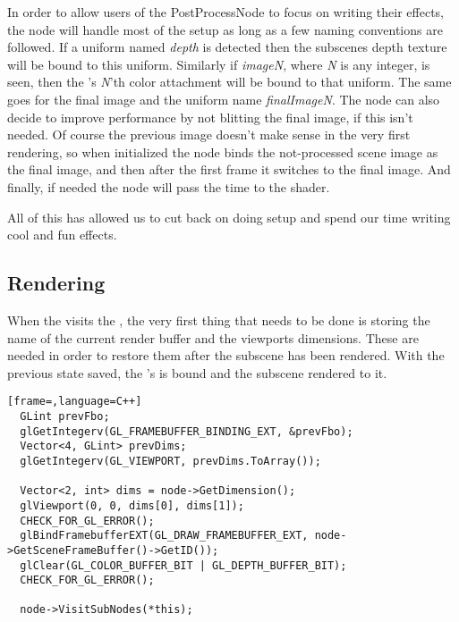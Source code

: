 In order to allow users of the PostProcessNode to focus on writing
their effects, the node will handle most of the setup as long as a few
naming conventions are followed. If a uniform named \textit{depth} is
detected then the subscenes depth texture will be bound to this
uniform. Similarly if \textit{imageN}, where \textit{N} is any
integer, is seen, then the 's \textit{N}'th color
attachment will be bound to that uniform. The same goes for the final
image and the uniform name \textit{finalImageN}. The node can also
decide to improve performance by not blitting the final image, if this
isn't needed. Of course the previous image doesn't make sense in the
very first rendering, so when initialized the node binds the
not-processed scene image as the final image, and then after the first
frame it switches to the final image. And finally, if needed the node
will pass the time to the shader.

All of this has allowed us to cut back on doing setup and spend our
time writing cool and fun effects.

\subsection*{Rendering}


When the  visits the , the
very first thing that needs to be done is storing the name of the
current render buffer and the viewports dimensions. These are needed
in order to restore them after the subscene has been rendered. With
the previous state saved, the 's
 is bound and the subscene rendered to it.

\begin{lstlisting}[frame=,language=C++]
  GLint prevFbo;
  glGetIntegerv(GL_FRAMEBUFFER_BINDING_EXT, &prevFbo);
  Vector<4, GLint> prevDims;
  glGetIntegerv(GL_VIEWPORT, prevDims.ToArray());
  
  Vector<2, int> dims = node->GetDimension();
  glViewport(0, 0, dims[0], dims[1]);
  CHECK_FOR_GL_ERROR();
  glBindFramebufferEXT(GL_DRAW_FRAMEBUFFER_EXT, node->GetSceneFrameBuffer()->GetID());
  glClear(GL_COLOR_BUFFER_BIT | GL_DEPTH_BUFFER_BIT);
  CHECK_FOR_GL_ERROR();
  
  node->VisitSubNodes(*this);
\end{lstlisting}



